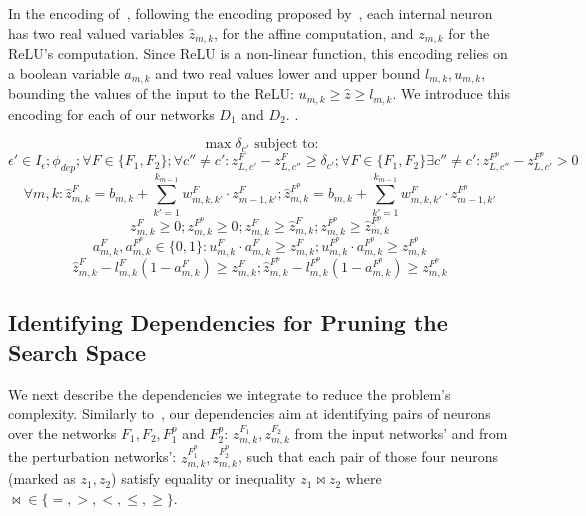 In the encoding of~\cite{VHAGAR}, following the encoding proposed by~\cite{MIPVERIFY}, each internal neuron has two real valued variables $\hat{z}_{m,k}$, for the affine computation, and ${z}_{m,k}$ for the ReLU's computation. Since ReLU is a non-linear function, this encoding relies on a boolean variable $a_{m,k}$ and two real values lower and upper bound $l_{m,k},u_{m,k}$, bounding the values of the input to the ReLU: $u_{m,k}\geq{\hat{z}}\geq{l_{m,k}}$.
We introduce this encoding for each of our networks $D_1$ and $D_2$.
.

$$\max{\delta_{c'}} \text{ subject to:}$$
$$ \epsilon'\in{I_\epsilon}; \phi_{dep}; \forall{F}\in{\{F_1,F_2\}}; \forall{c''}\neq{c'}: z^{F}_{L,c'}-z^{F}_{L,c''}\geq\delta_{c'}; \forall{F}\in{\{F_1,F_2\}}\exists{c''}\neq{c'}: z^{F^p}_{L,c''}-z^{F^p}_{L,c'}>0$$
$$\forall{m,k}: \hat{z}^F_{m,k}=b_{m,k}+\sum_{k'=1}^{k_{m-1}} w^F_{m,k,k'}\cdot{z^F_{m-1,k'}}; \hat{z}^{F^p}_{m,k}=b_{m,k}+\sum_{k'=1}^{k_{m-1}} w^F_{m,k,k'}\cdot{z^{F^p}_{m-1,k'}}$$
$$z^F_{m,k}\geq0; z^{F^p}_{m,k}\geq0; z^F_{m,k}\geq{\hat{z}^F_{m,k}}; z^{F^p}_{m,k}\geq{\hat{z}^{F^p}_{m,k}}$$
$$a^F_{m,k},a^{F^p}_{m,k}\in{\{0,1\}}: u^F_{m,k}\cdot{a^F_{m,k}}\geq{z^F_{m,k}}; u^{F^p}_{m,k}\cdot{a^{F^p}_{m,k}}\geq{z^{F^p}_{m,k}}$$
$$\hat{z}^F_{m,k}-l^F_{m,k}(1-a^F_{m,k})\geq{z^F_{m,k}}; \hat{z}^{F^p}_{m,k}-l^{F^p}_{m,k}(1-a^{F^p}_{m,k})\geq{z^{F^p}_{m,k}}$$


\subsection{Identifying Dependencies for Pruning the Search Space}\label{PRUNESUBSECTION}
We next describe the dependencies we integrate to reduce the problem's complexity.
Similarly to~\cite{VHAGAR}, our dependencies aim at identifying pairs of neurons over the networks $F_1, F_2, F^p_1$ and $F^p_2$: 
$z^{F_1}_{m,k},z^{F_2}_{m,k}$ from the input networks' and from the perturbation networks': $z^{F^p_1}_{m,k}, z^{F^p_2}_{m,k}$, such that each pair of those four neurons (marked as $z_1,z_2$) satisfy equality or inequality $z_1\bowtie z_2$ where $\bowtie\in{\{=,>,<,\le,\ge\}}$. 

